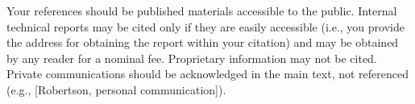 \documentclass{chi-ext}
\begin{document}
Your references should be published materials accessible to the public.
Internal technical reports may be cited only if they are easily accessible (i.e., you provide the address for obtaining the report within your citation) and may be obtained by any reader for a nominal fee.
Proprietary information may not be cited.
Private communications should be acknowledged in the main text, not referenced  (e.g., [Robertson, personal communication]).
%
%
%
%
\end{document}
